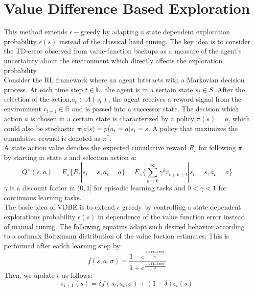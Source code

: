 \documentclass[10.5pt]{article}
\def\N{{\mathbb{N}}}
\def\R{{\mathbb{R}}}
\begin{document}
\section{Value Difference Based Exploration}
This method extends $\epsilon-$greedy by adapting a state dependent exploration probability $\epsilon(s)$ instead of the classical hand tuning. The key idea is to consider the TD-error observed from value-function backups as a measure of the agent's uncertainty about the environment which directly affects the exploration probability. \\

Consider the RL framework where an agent interacts with a Markovian decision process. At each time step $t\in \N$, the agent is in a sertain state $s_t\in S$. After the selection of the action,$ a_t\in A(s_t)$, the agent receives a reward signal from the environment $r_{t+1} \in \R$ and is passed into a successor state. The decision which action $a$ is chosen in a certain state is characterized by a policy $\pi(s) = a$, which could also be stochastic $\pi(a|s) = p(a_t=a|s_t=s$. A policy that maximizes the cumulative reward is denoted as $\pi^*$. \\

A state action value denotes the expected cumulative reward $R_t$ for following $\pi$ by starting in state $s$ and selection action $a$: 
\begin{equation}
Q^\pi(s,a) = E_\pi \{R_t|s_t=s, a_t=a\} = E_\pi \{\sum_{k=0}^\infty \gamma^kr_{t+k+1}|s_t=s,a_t=a\}
\end{equation} 
$\gamma$ is a discount factor in $(0,1]$ for episodic learning tasks and $0<\gamma< 1$ for continuous learning tasks. \\

The basic idea of VDBE is to extend $\epsilon$ greedy by controlling a state dependent explorations probability $\epsilon(s)$ in dependence of the value function error instead of manual tuning. The following equatins adapt such desired behavior according to a softmax Boltzmann distribution of the value fuction estimates. This is performed after eadch learning step by: 
\begin{equation}
f(s,a,\sigma) = \dfrac{1-e^\frac{-|a\text{TD-Error}|}{\sigma}}{1+e^\frac{-|a\text{TD-Error}|}{\sigma}}
\end{equation}
Then, we update $\epsilon$ as follows: 
\begin{equation}
\epsilon_{t+1}(s) =\delta f(s_t, a_t, \sigma) + (1-\delta) \epsilon_t(s)
\end{equation}
\end{document}
